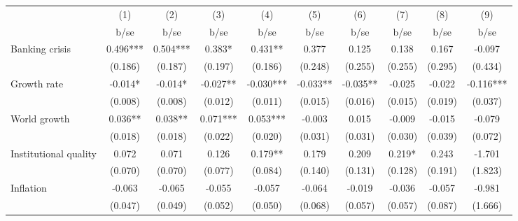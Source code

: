 \begin{tabular}{l*{9}{c}}
                                &\multicolumn{1}{c}{(1)}   &\multicolumn{1}{c}{(2)}   &\multicolumn{1}{c}{(3)}   &\multicolumn{1}{c}{(4)}   &\multicolumn{1}{c}{(5)}   &\multicolumn{1}{c}{(6)}   &\multicolumn{1}{c}{(7)}   &\multicolumn{1}{c}{(8)}   &\multicolumn{1}{c}{(9)}   \\
                                &        b/se   &        b/se   &        b/se   &        b/se   &        b/se   &        b/se   &        b/se   &        b/se   &        b/se   \\
\hline
Banking crisis                  &       0.496***&       0.504***&       0.383*  &       0.431** &       0.377   &       0.125   &       0.138   &       0.167   &      -0.097   \\
                                &     (0.186)   &     (0.187)   &     (0.197)   &     (0.186)   &     (0.248)   &     (0.255)   &     (0.255)   &     (0.295)   &     (0.434)   \\
Growth rate                     &      -0.014*  &      -0.014*  &      -0.027** &      -0.030***&      -0.033** &      -0.035** &      -0.025   &      -0.022   &      -0.116***\\
                                &     (0.008)   &     (0.008)   &     (0.012)   &     (0.011)   &     (0.015)   &     (0.016)   &     (0.015)   &     (0.019)   &     (0.037)   \\
World growth                    &       0.036** &       0.038** &       0.071***&       0.053***&      -0.003   &       0.015   &      -0.009   &      -0.015   &      -0.079   \\
                                &     (0.018)   &     (0.018)   &     (0.022)   &     (0.020)   &     (0.031)   &     (0.031)   &     (0.030)   &     (0.039)   &     (0.072)   \\
Institutional quality           &       0.072   &       0.071   &       0.126   &       0.179** &       0.179   &       0.209   &       0.219*  &       0.243   &      -1.701   \\
                                &     (0.070)   &     (0.070)   &     (0.077)   &     (0.084)   &     (0.140)   &     (0.131)   &     (0.128)   &     (0.191)   &     (1.823)   \\
Inflation                       &      -0.063   &      -0.065   &      -0.055   &      -0.057   &      -0.064   &      -0.019   &      -0.036   &      -0.057   &      -0.981   \\
                                &     (0.047)   &     (0.049)   &     (0.052)   &     (0.050)   &     (0.068)   &     (0.057)   &     (0.057)   &     (0.087)   &     (1.666)   \\

\end{tabular}
